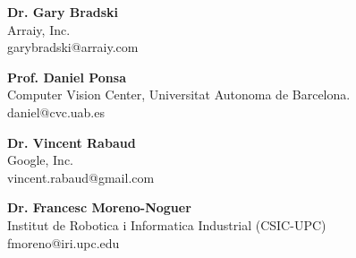 \textbf{Dr. Gary Bradski}\\
Arraiy, Inc.\\
garybradski@arraiy.com

\textbf{Prof. Daniel Ponsa}\\
Computer Vision Center, Universitat Autonoma de Barcelona.\\
daniel@cvc.uab.es

\textbf{Dr. Vincent Rabaud}\\
Google, Inc.\\
vincent.rabaud@gmail.com

\textbf{Dr. Francesc Moreno-Noguer}\\
Institut de Robotica i Informatica Industrial (CSIC-UPC)   
\\
fmoreno@iri.upc.edu